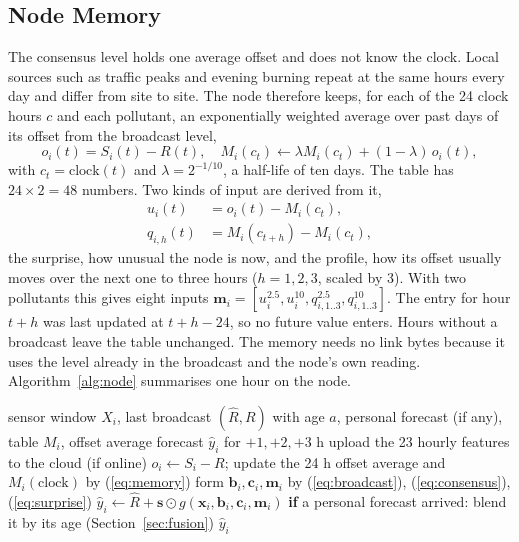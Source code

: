 \documentclass[journal]{IEEEtran}
\begin{document}
\subsection{Node Memory}
The consensus level holds one average offset and does not know the clock. Local sources such as traffic peaks and evening burning repeat at the same hours every day and differ from site to site. The node therefore keeps, for each of the 24 clock hours $c$ and each pollutant, an exponentially weighted average over past days of its offset from the broadcast level,
\begin{equation}
o_i(t)=S_i(t)-R(t),\quad M_i(c_t)\leftarrow \lambda M_i(c_t)+(1-\lambda)\,o_i(t),
\label{eq:memory}
\end{equation}
with $c_t=\mathrm{clock}(t)$ and $\lambda=2^{-1/10}$, a half-life of ten days. The table has $24\times2=48$ numbers. Two kinds of input are derived from it,
\begin{equation}
\begin{split}
u_i(t)&=o_i(t)-M_i(c_t),\\
q_{i,h}(t)&=M_i(c_{t+h})-M_i(c_t),
\end{split}
\label{eq:surprise}
\end{equation}
the surprise, how unusual the node is now, and the profile, how its offset usually moves over the next one to three hours ($h=1,2,3$, scaled by 3). With two pollutants this gives eight inputs $\mathbf{m}_i=[u^{2.5}_i,u^{10}_i,q_{i,1..3}^{2.5},q_{i,1..3}^{10}]$. The entry for hour $t{+}h$ was last updated at $t{+}h{-}24$, so no future value enters. Hours without a broadcast leave the table unchanged. The memory needs no link bytes because it uses the level already in the broadcast and the node's own reading. Algorithm~\ref{alg:node} summarises one hour on the node.

\begin{algorithm}[!t]
\caption{One hour on a SplitMem node}
\label{alg:node}
\begin{algorithmic}[1]
\Require sensor window $X_i$, last broadcast $(\hat R, R)$ with age $a$, personal forecast (if any), table $M_i$, offset average
\Ensure forecast $\hat y_i$ for $+1,+2,+3$ h
\State upload the 23 hourly features to the cloud (if online)
\State $o_i\leftarrow S_i-R$; update the 24 h offset average and $M_i(\mathrm{clock})$ by (\ref{eq:memory})
\State form $\mathbf{b}_i,\mathbf{c}_i,\mathbf{m}_i$ by (\ref{eq:broadcast}), (\ref{eq:consensus}), (\ref{eq:surprise})
\State $\hat y_i\leftarrow \hat R+\mathbf{s}\odot g(\mathbf{x}_i,\mathbf{b}_i,\mathbf{c}_i,\mathbf{m}_i)$ 
\State \textbf{if} a personal forecast arrived: blend it by its age (Section~\ref{sec:fusion})
\State \Return $\hat y_i$
\end{algorithmic}
\end{algorithm}
\end{document}
